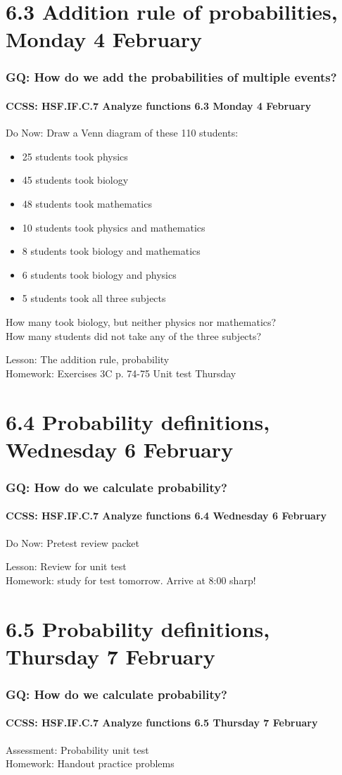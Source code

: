 \documentclass{beamer}
\begin{document}
\section{6.3 Addition rule of probabilities, Monday 4 February}
  \frame
  {
    \frametitle{GQ: How do we add the probabilities of multiple events?}
    \framesubtitle{CCSS: HSF.IF.C.7 Analyze functions \hfill \alert{6.3 Monday 4 February}}

    \begin{block}{Do Now: Draw a Venn diagram of these 110 students:}
      \begin{itemize}
        \item 25 students took physics
        \item 45 students took biology
        \item 48 students took mathematics
        \item 10 students took physics and mathematics
        \item 8 students took biology and mathematics
        \item 6 students took biology and physics
        \item 5 students took all three subjects
      \end{itemize}
      How many took biology, but neither physics nor mathematics?\\
      How many students did not take any of the three subjects?
    \end{block}
    Lesson: The addition rule, probability \\
    Homework: Exercises 3C p. 74-75 \alert{Unit test Thursday}
  }

  \section{6.4 Probability definitions, Wednesday 6 February}
    \frame
    {
      \frametitle{GQ: How do we calculate probability?}
      \framesubtitle{CCSS: HSF.IF.C.7 Analyze functions \hfill \alert{6.4 Wednesday 6 February}}

      \begin{block}{Do Now: Pretest review packet}
      \end{block}
      Lesson: Review for unit test \\ \bigskip
      Homework: study for \alert{test tomorrow}. Arrive at 8:00 sharp!
    }


  \section{6.5 Probability definitions, Thursday 7 February}
    \frame
    {
      \frametitle{GQ: How do we calculate probability?}
      \framesubtitle{CCSS: HSF.IF.C.7 Analyze functions \hfill \alert{6.5 Thursday 7 February}}

      Assessment: Probability unit test \\ \bigskip
      Homework: Handout practice problems
    }
\end{document}

